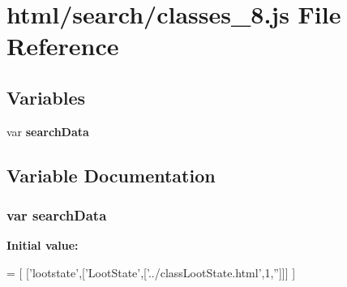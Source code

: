 \section{html/search/classes\-\_\-8.js File Reference}
\label{classes__8_8js}
\subsection*{Variables}
\begin{DoxyCompactItemize}
\item 
var {\bf search\-Data}
\end{DoxyCompactItemize}


\subsection{Variable Documentation}
\subsubsection[{search\-Data}]{\setlength{\rightskip}{0pt plus 5cm}var search\-Data}\label{classes__8_8js_ad01a7523f103d6242ef9b0451861231e}
{\bfseries Initial value\-:}
\begin{DoxyCode}
=
[
  [\textcolor{stringliteral}{'lootstate'},[\textcolor{stringliteral}{'LootState'},[\textcolor{stringliteral}{'../classLootState.html'},1,\textcolor{stringliteral}{''}]]]
]
\end{DoxyCode}
